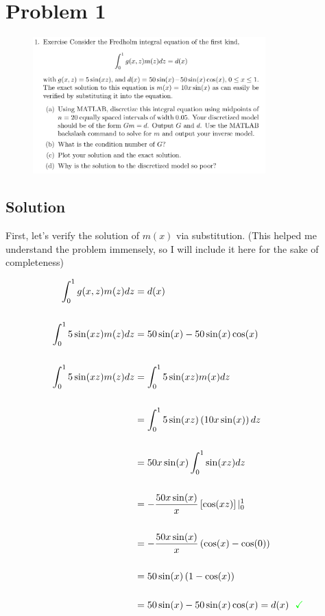 
\begingroup
\allowdisplaybreaks

\newpage
\section{Problem 1}

\begin{figure}[h]
	\centering
	\includegraphics[width=0.8\textwidth]{./images/problem_1_statement.png}
\end{figure}

\subsection{Solution}

First, let's verify the solution of $m(x)$ via substitution. (This helped me understand the problem immensely, so I will include it here for the sake of completeness)

\begin{align*}
	\int_{0}^{1} g(x,z) m(z) dz &= d(x) \\
	\\
	\int_{0}^{1} 5 \sin(xz) m(z) dz &= 50 \sin(x) - 50 \sin(x) \cos(x) \\
	\\
	\int_{0}^{1} 5 \sin(xz) m(z) dz &= \int_{0}^{1} 5 \sin(xz) m(x) dz \\
	\\
	&= \int_{0}^{1} 5 \sin(xz) \left( 10 x \sin(x) \right) dz \\
	\\
	&= 50 x \sin(x) \int_{0}^{1} \sin(xz) dz \\
	\\
	&= - \frac{50 x \sin(x)}{x} \left[ \cos(xz) \right] |_{0}^{1} \\
	\\
	&= - \frac{50 x \sin(x)}{x} \left( \cos(x) - \cos(0) \right) \\
	\\
	&= 50 \sin(x) \left( 1 - \cos(x) \right) \\
	\\
	&= 50 \sin(x) - 50 \sin(x) \cos(x) = d(x) \,\,\,\, \textcolor{green}{\checkmark}
\end{align*}
	
